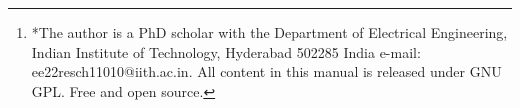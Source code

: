 \documentclass[journal,12pt,twocolumn]{IEEEtran}
\begin{document}
	\author{Satheesh K Simhachalam$^{*}$%
		\thanks{*The author is a PhD scholar with the Department
			of Electrical Engineering, Indian Institute of Technology, Hyderabad
			502285 India e-mail:  ee22resch11010@iith.ac.in. All content in this manual is released under GNU GPL.  Free and open source.}%
}
% 
%



% 




\end{document}
